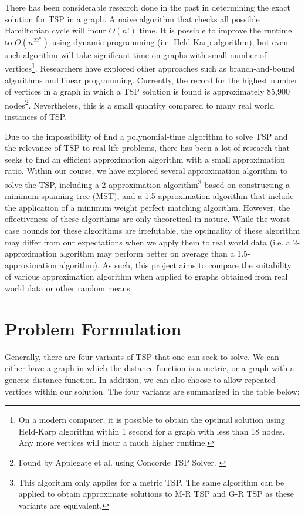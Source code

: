 \documentclass[paper=a4, fontsize=11pt]{scrartcl}	%
\numberwithin{equation}{section}		%
\numberwithin{figure}{section}			%
\numberwithin{table}{section}				%
\begin{document}
There has been considerable research done in the past in determining the exact solution for TSP in a graph. A naive algorithm that checks all possible Hamiltonian cycle will incur $O(n!)$ time. It is possible to improve the runtime to $O(n^22^n)$ using dynamic programming (i.e. Held-Karp algorithm), but even such algorithm will take significant time on graphs with small number of vertices\footnote{On a modern computer, it is possible to obtain the optimal solution using Held-Karp algorithm within 1 second for a graph with less than 18 nodes. \cite{steven} Any more vertices will incur a much higher runtime.}. Researchers have explored other approaches such as branch-and-bound algorithms and linear programming. Currently, the record for the highest number of vertices in a graph in which a TSP solution is found is approximately 85,900 nodes\footnote{Found by Applegate et al. using Concorde TSP Solver. \cite{appleman}}. Nevertheless, this is a small quantity compared to many real world instances of TSP.

Due to the impossibility of find a polynomial-time algorithm to solve TSP and the relevance of TSP to real life problems, there has been a lot of research that seeks to find an efficient approximation algorithm with a small approximation ratio. Within our course, we have explored several approximation algorithm to solve the TSP, including a 2-approximation algorithm\footnote{This algorithm only applies for a metric TSP. The same algorithm can be applied to obtain approximate solutions to M-R TSP and G-R TSP as these variants are equivalent.} based on constructing a minimum spanning tree (MST), and a 1.5-approximation algorithm that include the application of a minimum weight perfect matching algorithm. However, the effectiveness of these algorithms are only theoretical in nature. While the worst-case bounds for these algorithms are irrefutable, the optimality of these algorithm may differ from our expectations when we apply them to real world data (i.e. a 2-approximation algorithm may perform better on average than a 1.5-approximation algorithm). As such, this project aims to compare the suitability of various approximation algorithm when applied to graphs obtained from real world data or other random means. 

\section{Problem Formulation}

Generally, there are four variants of TSP that one can seek to solve. We can either have a graph in which the distance function is a metric, or a graph with a generic distance function. In addition, we can also choose to allow repeated vertices within our solution. The four variants are summarized in the table below:
\end{document}
